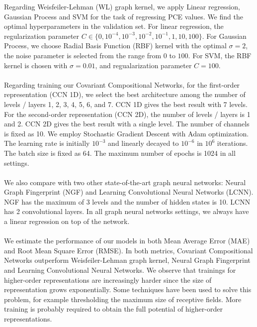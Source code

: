 \documentclass[a4paper]{article}
\begin{document}
Regarding Weisfeiler-Lehman (WL) graph kernel, we apply Linear regression, Gaussian Process and SVM for the task of regressing PCE values. We find the optimal hyperparameters in the validation set. For linear regression, the regularization parameter $C \in \{0, 10^{-4}, 10^{-3}, 10^{-2}, 10^{-1}, 1, 10, 100\}$. For Gaussian Process, we choose Radial Basis Function (RBF) kernel with the optimal $\sigma = 2$, the noise parameter is selected from the range from $0$ to $100$. For SVM, the RBF kernel is chosen with $\sigma = 0.01$, and regualarization parameter $C = 100$. \\ \\
Regarding training our Covariant Compositional Networks, for the first-order representation (CCN 1D), we select the best architecture among the number of levels / layers 1, 2, 3, 4, 5, 6, and 7. CCN 1D gives the best result with 7 levels. For the second-order representation (CCN 2D), the number of levels / layers is 1 and 2. CCN 2D gives the best result with a single level. The number of channels is fixed as 10. We employ Stochastic Gradient Descent with Adam optimization. The learning rate is initially $10^{-3}$ and linearly decayed to $10^{-6}$ in $10^6$ iterations. The batch size is fixed as 64. The maximum number of epochs is 1024 in all settings. \\ \\
We also compare with two other state-of-the-art graph neural networks: Neural Graph Fingerprint (NGF) and Learning Convolutional Neural Networks (LCNN). NGF has the maximum of 3 levels and the number of hidden states is 10. LCNN has 2 convolutional layers. In all graph neural networks settings, we always have a linear regression on top of the network. \\ \\
We estimate the performance of our models in both Mean Average Error (MAE) and Root Mean Square Error (RMSE). In both metrics, Covariant Compositional Networks outperform Weisfeiler-Lehman graph kernel, Neural Graph Fingerprint and Learning Convolutional Neural Networks. We observe that trainings for higher-order representations are increasingly harder since the size of representation grows exponentially. Some techniques have been used to solve this problem, for example thresholding the maximum size of receptive fields. More training is probably required to obtain the full potential of higher-order representations.
\end{document}
